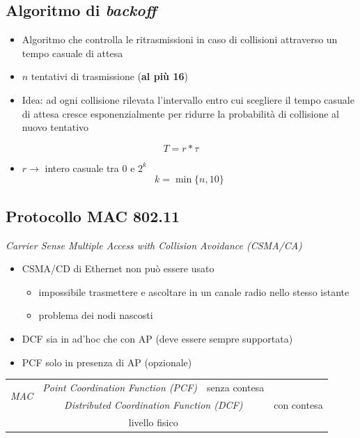 \documentclass{book}
\begin{document}
\subsection{Algoritmo di \textit{backoff}}
\begin{itemize}
\item Algoritmo che controlla le ritrasmissioni in caso di collisioni
  attraverso un tempo casuale di attesa
\item $n$ tentativi di trasmissione (\textbf{al più 16})
  \item {\color{red} Idea: ad ogni collisione rilevata l’intervallo entro cui scegliere il
tempo casuale di attesa cresce esponenzialmente per ridurre la
probabilità di collisione al nuovo tentativo}
\end{itemize}
\begin{equation}
	T=r*\tau
\end{equation}
\begin{itemize}
\item $r\to$ intero casuale tra 0 e $2^k$
  \begin{equation}
	k=\min\{n,10\}
  \end{equation}  
\end{itemize}
\subsection{Protocollo MAC 802.11}
\textit{Carrier Sense Multiple Access with Collision Avoidance (CSMA/CA)}
\begin{itemize}
\item CSMA/CD di Ethernet non può essere usato
  \begin{itemize}
  \item impossibile trasmettere e ascoltare in un canale radio nello stesso istante
  \item problema dei nodi nascosti
  \end{itemize}
\item DCF sia in ad'hoc che con AP (deve essere sempre supportata)
\item PCF solo in presenza di AP (opzionale)
\end{itemize}
\begin{table}[!h]
  \centering
  \begin{tabular}{c|c|cc}
    \cline{2-2}
    \multirow{2}{*}{\textit{MAC}}&\textit{Point Coordination Function (PCF)}&senza contesa\\
    		\cline{2-3}
    		&\multicolumn{2}{c|}{\textit{Distributed Coordination Function (DCF)}}&con contesa\\
    		\cline{2-3}
    		&\multicolumn{2}{c|}{livello fisico}&\\\cline{2-3}
  \end{tabular}
\end{table}
\end{document}
